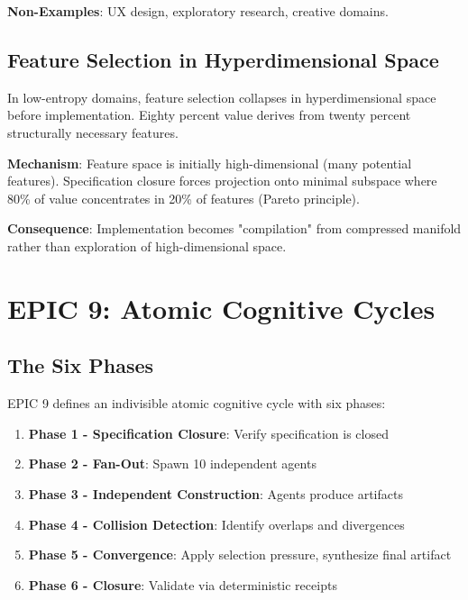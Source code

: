 \documentclass[12pt,oneside,a4paper]{book}
\theoremstyle{definition}
\begin{document}
\textbf{Non-Examples}: UX design, exploratory research, creative domains.

\section{Feature Selection in Hyperdimensional Space}
\label{sec:bb80-feature-collapse}

\begin{principle}
In low-entropy domains, feature selection collapses in hyperdimensional space
before implementation. Eighty percent value derives from twenty percent
structurally necessary features.
\end{principle}

\textbf{Mechanism}: Feature space is initially high-dimensional (many potential
features). Specification closure forces projection onto minimal subspace where
80\% of value concentrates in 20\% of features (Pareto principle).

\textbf{Consequence}: Implementation becomes "compilation" from compressed
manifold rather than exploration of high-dimensional space.


\chapter{EPIC 9: Atomic Cognitive Cycles}
\label{ch:epic9}


\section{The Six Phases}
\label{sec:epic9-phases}

EPIC 9 defines an indivisible atomic cognitive cycle with six phases:

\begin{enumerate}
  \item \textbf{Phase 1 - Specification Closure}: Verify specification is closed
  \item \textbf{Phase 2 - Fan-Out}: Spawn 10 independent agents
  \item \textbf{Phase 3 - Independent Construction}: Agents produce artifacts
  \item \textbf{Phase 4 - Collision Detection}: Identify overlaps and divergences
  \item \textbf{Phase 5 - Convergence}: Apply selection pressure, synthesize final artifact
  \item \textbf{Phase 6 - Closure}: Validate via deterministic receipts
\end{enumerate}
\end{document}
